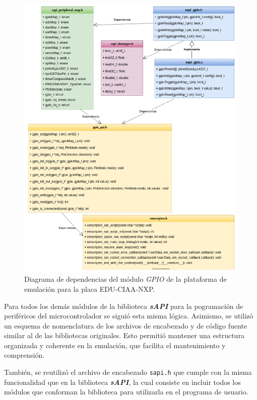 \begin{figure}[ht]
	\centering
	\includegraphics[scale=.41]{./Figures/DiagramaClasesEmulador.png}
	\caption{Diagrama de dependencias del módulo \textit{GPIO} de la plataforma de emulación para la placa EDU-CIAA-NXP.}
	\label{fig:GPIOEmulador}
\end{figure}


Para todos los demás módulos de la biblioteca \textit{\textbf{sAPI}} para la pogramación de periféricos del microcontrolador se siguió esta misma lógica. Asimismo, se utilizó un esquema de nomenclatura de los archivos de encabezado y de código fuente similar al de las bibliotecas originales.  Esto permitió mantener una estructura organizada y coherente en la emulación, que facilita el mantenimiento y comprensión.


También, se reutilizó el archivo de encabezado \texttt{sapi.h} que cumple con la misma funcionalidad que en la biblioteca \textit{\textbf{sAPI}}, la cual consiste en incluir todos los módulos que conforman la biblioteca para utilizarla en el programa de usuario. 

